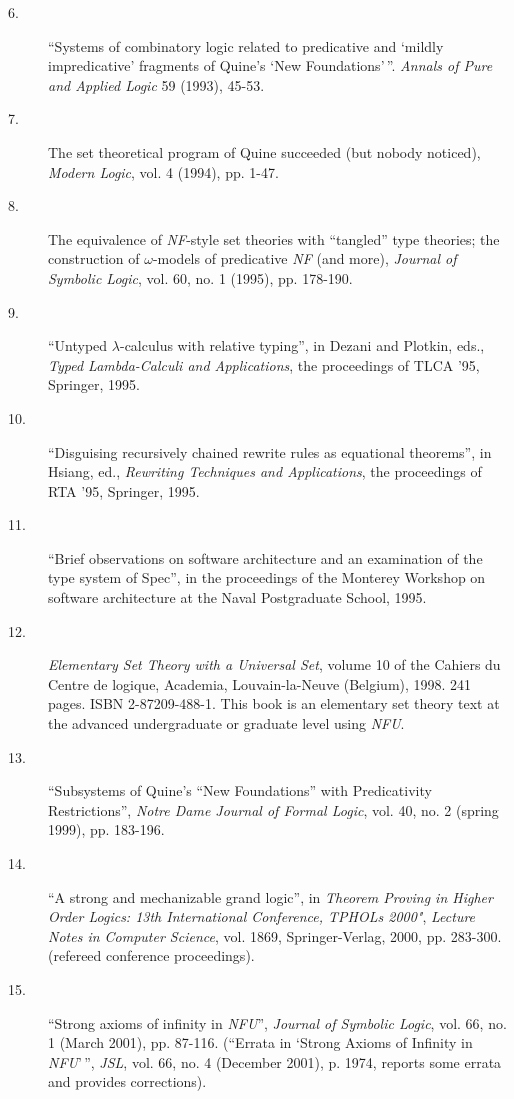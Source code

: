 \begin{description}
\begin{description}
                \item[6.]  ``Systems of combinatory logic related to
predicative and `mildly impredicative' fragments of Quine's `New
Foundations'\,''.  {\em Annals of Pure and Applied Logic\/} 59 (1993),
45-53.
                \item[7.]  The set theoretical program of Quine
succeeded (but nobody noticed), {\em Modern Logic\/}, vol. 4 (1994),
pp. 1-47.
\item[8.] The equivalence of {\em NF\/}-style set theories with
``tangled'' type theories; the construction of $\omega$-models of
predicative {\em NF\/} (and more), {\em Journal of Symbolic Logic\/},
vol. 60, no. 1 (1995), pp. 178-190.

\item [9.] ``Untyped $\lambda$-calculus with relative typing'', in Dezani
  and Plotkin, eds., {\em Typed Lambda-Calculi and Applications\/},
  the proceedings of TLCA '95, Springer, 1995.

\item[10.] ``Disguising recursively chained rewrite rules as equational
  theorems'', in Hsiang, ed., {\em Rewriting Techniques and
    Applications\/}, the proceedings of RTA '95, Springer, 1995.

\item[11.] ``Brief observations on software architecture and an
  examination of the type system of Spec'', in the proceedings of the
  Monterey Workshop on software architecture at the Naval Postgraduate
  School, 1995.

\item [12.]  {\em Elementary Set Theory with a
Universal Set\/}, volume 10 of the Cahiers du Centre de logique,
Academia, Louvain-la-Neuve (Belgium), 1998. 241 pages. ISBN
2-87209-488-1.  This book is an elementary set theory text at the
advanced undergraduate or graduate level using {\em NFU\/}.

\item[13.]  ``Subsystems of Quine's ``New Foundations'' with
Predicativity Restrictions'', {\em Notre Dame Journal of
Formal Logic\/}, vol. 40, no. 2 (spring 1999), pp. 183-196.

\item[14.]  ``A strong and mechanizable grand logic'', in {\em Theorem
Proving in Higher Order Logics: 13th International Conference, TPHOLs
2000"\/}, {\em Lecture Notes in Computer Science\/}, vol. 1869,
Springer-Verlag, 2000, pp. 283-300.  (refereed conference
proceedings).

\item[15.]  ``Strong axioms of infinity in {\em NFU\/}'', {\em Journal
of Symbolic Logic\/}, vol. 66, no. 1 (March 2001), pp. 87-116.  (``Errata in `Strong Axioms of Infinity in {\em NFU\/}'\,'', {\em JSL\/}, vol. 66, no. 4 (December 2001), p. 1974, reports some errata and provides corrections).


\end{description}
\end{description}
